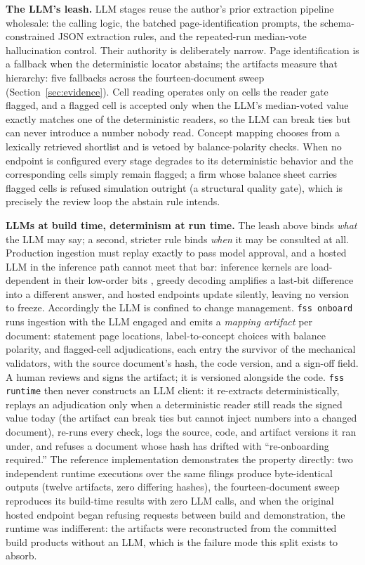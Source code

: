 \documentclass[11pt]{article}
\newcommand{\lead}[2]{\par\addvspace{5pt}\textbf{\textcolor{#1}{#2}}}
\begin{document}
\lead{navytwo}{The LLM's leash.} LLM stages reuse the author's prior extraction pipeline wholesale: the calling logic, the batched page-identification prompts, the schema-constrained JSON extraction rules, and the repeated-run median-vote hallucination control. Their authority is deliberately narrow. Page identification is a fallback when the deterministic locator abstains; the artifacts measure that hierarchy: five fallbacks across the fourteen-document sweep (Section~\ref{sec:evidence}). Cell reading operates only on cells the reader gate flagged, and a flagged cell is accepted only when the LLM's median-voted value exactly matches one of the deterministic readers, so the LLM can break ties but can never introduce a number nobody read. Concept mapping chooses from a lexically retrieved shortlist and is vetoed by balance-polarity checks. When no endpoint is configured every stage degrades to its deterministic behavior and the corresponding cells simply remain flagged; a firm whose balance sheet carries flagged cells is refused simulation outright (a structural quality gate), which is precisely the review loop the abstain rule intends.

\lead{navytwo}{LLMs at build time, determinism at run time.} The leash above binds \emph{what} the LLM may say; a second, stricter rule binds \emph{when} it may be consulted at all. Production ingestion must replay exactly to pass model approval, and a hosted LLM in the inference path cannot meet that bar: inference kernels are load-dependent in their low-order bits \cite{tml_determinism}, greedy decoding amplifies a last-bit difference into a different answer, and hosted endpoints update silently, leaving no version to freeze. Accordingly the LLM is confined to change management. \texttt{fss onboard} runs ingestion with the LLM engaged and emits a \emph{mapping artifact} per document: statement page locations, label-to-concept choices with balance polarity, and flagged-cell adjudications, each entry the survivor of the mechanical validators, with the source document's hash, the code version, and a sign-off field. A human reviews and signs the artifact; it is versioned alongside the code. \texttt{fss runtime} then never constructs an LLM client: it re-extracts deterministically, replays an adjudication only when a deterministic reader still reads the signed value today (the artifact can break ties but cannot inject numbers into a changed document), re-runs every check, logs the source, code, and artifact versions it ran under, and refuses a document whose hash has drifted with ``re-onboarding required.'' The reference implementation demonstrates the property directly: two independent runtime executions over the same filings produce byte-identical outputs (twelve artifacts, zero differing hashes), the fourteen-document sweep reproduces its build-time results with zero LLM calls, and when the original hosted endpoint began refusing requests between build and demonstration, the runtime was indifferent: the artifacts were reconstructed from the committed build products without an LLM, which is the failure mode this split exists to absorb.
\end{document}
